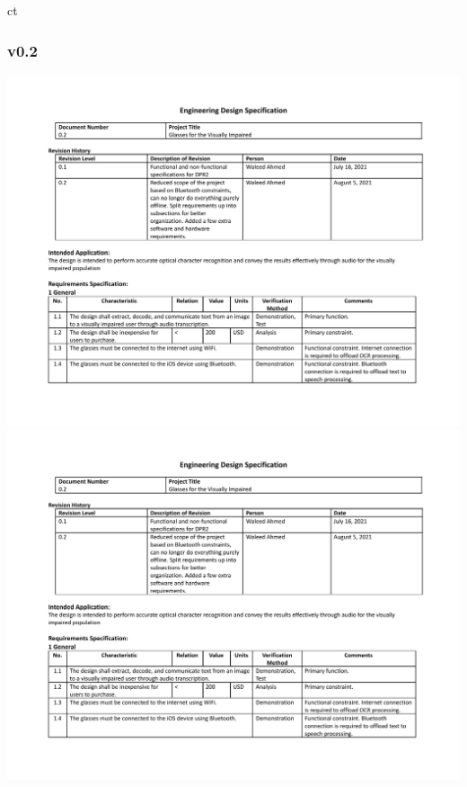 ct\documentclass[a4paper,11pt]{article}
\begin{document}
\begin{landscape}
    \newpage
    \subsubsection{v0.2}
    \label{eds-0.2}
    \begin{center}
        \includegraphics[page=1,width={0.86\linewidth}]{pdf/eds_0.2.pdf}
        \newpage
        \includegraphics[page=2,width={0.86\linewidth}]{pdf/eds_0.2.pdf}
        \newpage

\end{center}
\end{landscape}
\end{document}
